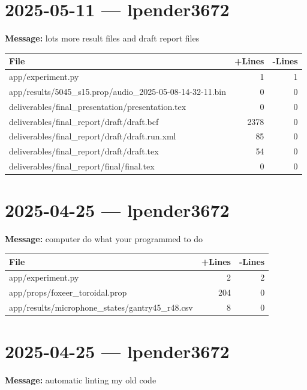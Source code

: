 \documentclass{article}
\begin{document}
\section*{2025-05-11 --- lpender3672}
\textbf{Message:} lots more result files and draft report files

\begin{longtable}{|p{10cm}|r|r|}
\hline \textbf{File} & \textbf{+Lines} & \textbf{-Lines} \\
\hline
app/experiment.py & 1 & 1 \\
\hline
app/results/5045\_s15.prop/audio\_2025-05-08-14-32-11.bin & 0 & 0 \\
\hline
deliverables/final\_presentation/presentation.tex & 0 & 0 \\
\hline
deliverables/final\_report/draft/draft.bcf & 2378 & 0 \\
\hline
deliverables/final\_report/draft/draft.run.xml & 85 & 0 \\
\hline
deliverables/final\_report/draft/draft.tex & 54 & 0 \\
\hline
deliverables/final\_report/final/final.tex & 0 & 0 \\
\hline
\end{longtable}

\section*{2025-04-25 --- lpender3672}
\textbf{Message:} computer do what your programmed to do

\begin{longtable}{|p{10cm}|r|r|}
\hline \textbf{File} & \textbf{+Lines} & \textbf{-Lines} \\
\hline
app/experiment.py & 2 & 2 \\
\hline
app/props/foxeer\_toroidal.prop & 204 & 0 \\
\hline
app/results/microphone\_states/gantry45\_r48.csv & 8 & 0 \\
\hline
\end{longtable}

\section*{2025-04-25 --- lpender3672}
\textbf{Message:} automatic linting my old code
\end{document}
